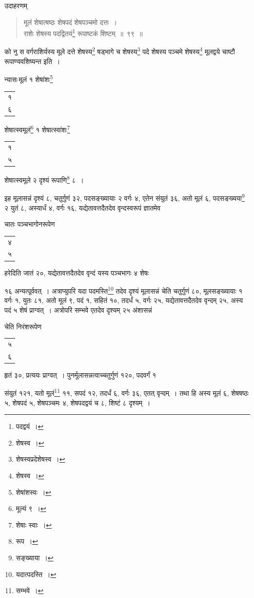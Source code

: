 \documentclass[10pt, openany]{book}
\begin{document}
{{\vspace{3mm}
{उदाहरणम्\textemdash}

\begin{quote}
    
{\eg मूलं शेषात्षष्ठः शेषपदं शेषपञ्चमो दत्तः~। \\
 राशेः शेषस्य पदद्वितयं\renewcommand{\thefootnote}{\s ३}\footnote{\s पदद्वयं~।} रूपाष्टकं शिष्टम्~॥~९९~॥}\end{quote}

{को नु स वर्गराशिर्यस्य मूले दत्ते शेषस्य\renewcommand{\thefootnote}{\s ४}\footnote{\s शेषस्व~।} षड्भागे च शेषस्य\renewcommand{\thefootnote}{\s ५}\footnote{\s शेषस्वप्रदेशेषस्व~।}
पदे शेषस्य पञ्चमे}
{शेषस्य\renewcommand{\thefootnote}{\s ६}\footnote{\s शेषस्व~।} मूलद्वये चाष्टौ रूपाण्यवशिष्यन्त इति~।} 
\vspace{3mm}

{न्यासः\textendash \,मूलं १ शेषांशः\renewcommand{\thefootnote}{\s ७}\footnote{\s शेषांशस्वः~।} \begin{tabular}{|c|}१ \\ ६\\\hline \end{tabular} शेषात्स्वमूलं\renewcommand{\thefootnote}{\s ८}\footnote{\s *मूल्यं ९~।} १
शेषात्स्वांशः\renewcommand{\thefootnote}{\s ९}\footnote{\s शेषाः स्वाः~।} \begin{tabular}{|c|}१ \\ ५\\\hline \end{tabular} शेषात्स्वमूले २ दृश्यं रूपाणि\renewcommand{\thefootnote}{\s १०}\footnote{\s रूप~।} ८~।}
\vspace{3mm}

{इह मूलासन्नं दृश्यं ८, चतुर्गुणं ३२, पदसङ्ख्यायाः २ वर्गः ४, एतेन
संयुतं ३६, अतो}
{मूलं ६, पदसङ्ख्यया\renewcommand{\thefootnote}{\s ११}\footnote{\s *सङ्ख्याया~।} २ युतं ८, अस्यार्धं ४, वर्गः १६,
यद्येतावत्तदैतदेव वृन्दस्वरूपं ज्ञातमेव}

\newpage

{चातः पञ्चभागोनरूपेण\begin{tabular}{r}४\\ ५\end{tabular}हरेदिति जातं २०, यद्येतावत्तदैतदेव वृन्दं यस्य
पञ्चभागः ४ शेषः}
{१६ अन्यत्पूर्ववत्~। अत्राप्युपरि यदा पदमस्ति\renewcommand{\thefootnote}{\s २}\footnote{\s यदात्पदस्ति~।} तदेव दृश्यं मूलासन्नं
चेति चतुर्गुणं ८०, मूलसङ्ख्यायाः १ वर्गः १, युतः ८१, अतो मूलं ९, पदं १, सहितं १०, तदर्धं ५,
वर्गः २५, यद्येतावत्तदैतदेव वृन्दम् २५, अस्य पदं ५ शेषं प्राग्वत्~। अत्रोपरि सम्भवे एतदेव
दृश्यम् २५ अंशासन्नं}
{चेति निरंशरूपेण\begin{tabular}{r}५\\ ६\end{tabular}हृतं ३०, प्रत्ययः प्राग्वत्~।
पुनर्मूलासन्नत्वाच्चतुर्गुणं १२०, पदवर्गं १}
{संयुतं १२१, यतो मूलं\renewcommand{\thefootnote}{\s ३}\footnote{\s सम्भवे~।} ११, सपदं १२, तदर्धं ६, वर्गः ३६, एतत् वृन्दम्~। तथा हि अस्य मूलं ६,}
{शेषषष्ठः ५, शेषपदं ५, शेषपञ्चमः ४, शेषपदद्वयं च ८, शिष्टं ८ दृश्यम्~।}
\vspace{3mm}

}}
\end{document}
